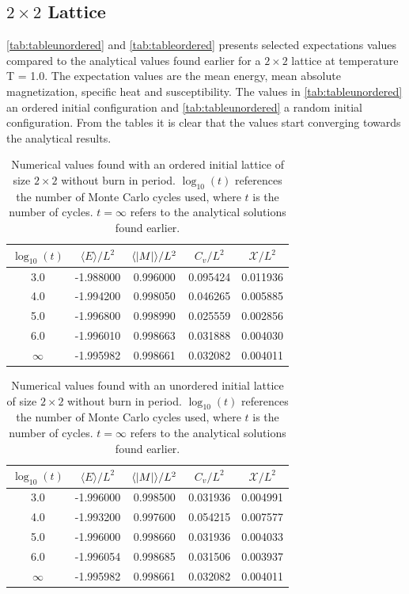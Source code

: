 \documentclass[%
reprint,
nofootinbib,
amsmath,amssymb,
aps,
]{revtex4-1}
\begin{document}
\subsection{$2\times 2$ Lattice} %
\autoref{tab:tableunordered} and \autoref{tab:tableordered} presents selected expectations values compared to the analytical values found earlier for a $2\times 2$ lattice at temperature T = 1.0. The expectation values are the mean energy, mean absolute magnetization, specific heat and susceptibility. The values in \autoref{tab:tableunordered} an ordered initial configuration and \autoref{tab:tableunordered} a random initial configuration. From the tables it is clear that the values start converging towards the analytical results. 
\begin{table}
	\centering
	\caption{Numerical values found with an ordered initial lattice of size $2\times 2$ without burn in period. $\log_{10}(t)$ references the number of Monte Carlo cycles used, where $t$ is the number of cycles. $ t = \infty$ refers to the analytical solutions found earlier.}
	\label{tab:tableordered}
	\begin{tabular}{|c|c|c|c|c|}
		\hline
		$\log_{10}(t)$ & $\langle E \rangle / L^2$ & $\langle \abs{M}\rangle / L^2$ & $C_v/L^2$ & $\mathcal{X}/L^2$\\
		\hline
		3.0 & -1.988000 &0.996000 &0.095424 &0.011936 \\
		4.0 & -1.994200 &0.998050 &0.046265 &0.005885 \\
		5.0 & -1.996800 &0.998990 &0.025559 &0.002856 \\
		6.0 & -1.996010 &0.998663 &0.031888 &0.004030 \\
		\hline
		$\infty$& -1.995982 & 0.998661 & 0.032082 & 0.004011\\
		\hline
	\end{tabular}
\end{table}
\begin{table}
	\centering
	\caption{Numerical values found with an unordered initial lattice of size $2\times 2$ without burn in period. $\log_{10}(t)$ references the number of Monte Carlo cycles used, where $t$ is the number of cycles. $ t = \infty$ refers to the analytical solutions found earlier.}
	\label{tab:tableunordered}
	\begin{tabular}{|c|c|c|c|c|}
		\hline
		$\log_{10}(t)$ & $\langle E \rangle / L^2$ & $\langle \abs{M}\rangle / L^2$ & $C_v/L^2$ & $\mathcal{X}/L^2$\\
		\hline
		3.0 & -1.996000 &0.998500 &0.031936 &0.004991 \\
		4.0 & -1.993200 &0.997600 &0.054215 &0.007577 \\
		5.0 & -1.996000 &0.998660 &0.031936 &0.004033 \\
		6.0 & -1.996054 &0.998685 &0.031506 &0.003937 \\
		\hline
		$\infty$& -1.995982 & 0.998661 & 0.032082 & 0.004011\\
		\hline
	\end{tabular}
\end{table}
\end{document}
